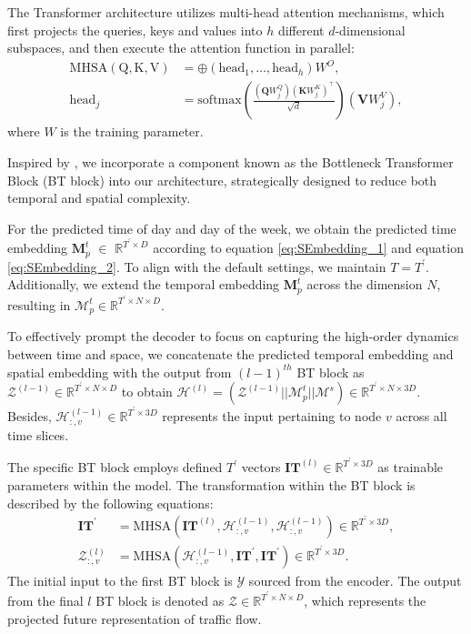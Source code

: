 The Transformer architecture utilizes multi-head attention mechanisms, which first projects the queries, keys and values into $h$ different $d$-dimensional subspaces, and then execute the attention function in parallel:
\begin{equation}
    \begin{aligned}
        \mathrm{MHSA(Q,K,V)}& =\oplus(\mathrm{head}_1,\ldots,\mathrm{head}_h)W^O, \\
        \mathrm{head}_{j}& =\mathrm{softmax}(\frac{(\mathbf{Q}W_{j}^{Q})(\mathbf{K}W_{j}^{K})^{\top}}{\sqrt{d}})(\mathbf{V}W_{j}^{V}), 
    \end{aligned}
\end{equation}
where $W$ is the training parameter.

Inspired by \citet{guo2023SSTBAN}, we incorporate a component known as the Bottleneck Transformer Block (BT block) into our architecture, strategically designed to reduce both temporal and spatial complexity.

For the predicted time of day and day of the week, we obtain the predicted time embedding $\mathbf{M}^{t}_{p}$ $\in$ $\mathbb{R}^{T^\prime \times D}$ according to equation \ref{eq:SEmbedding_1} and equation \ref{eq:SEmbedding_2}. To align with the default settings, we maintain $T = T^\prime$. Additionally, we extend the temporal embedding $\mathbf{M}^{t}_{p}$ across the dimension $ N $, resulting in $\bm{\mathcal{M}}^{t}_{p} \in \mathbb{R}^{T^\prime\times N\times D}$. 

To effectively prompt the decoder to focus on capturing the high-order dynamics between time and space, we concatenate the predicted temporal embedding and spatial embedding with the output from $(l - 1)^{th}$ BT block as $\bm{\mathcal{Z}}^{(l-1)} \in \mathbb{R}^{T^\prime\times N\times D}$ to obtain $\bm{\mathcal{H}}^{(l)}=(\bm{\mathcal{Z}}^{(l-1)}||\bm{\mathcal{M}}^{t}_{p}||\bm{\mathcal{M}}^{s}) \in \mathbb{R}^{T^\prime \times N \times 3D}$. Besides, $\bm{\mathcal{H}}^{(l-1)}_{:,v} \in \mathbb{R}^{T^\prime\times 3D}$ represents the input pertaining to node $v$ across all time slices.

The specific BT block employs defined $T^\prime$ vectors $\mathbf{IT}^{(l)} \in \mathbb{R}^{T^\prime\times 3D}$ as trainable parameters within the model. The transformation within the BT block is described by the following equations:
\begin{equation}
    \begin{aligned}
        \mathbf{IT}^\prime &= \mathrm{MHSA}(\mathbf{IT}^{(l)},\bm{\mathcal{H}}^{(l-1)}_{:,v},\bm{\mathcal{H}}^{(l-1)}_{:,v}) \in \mathbb{R}^{T^\prime\times 3D},\\
       \bm{\mathcal{Z}}^{(l)}_{:,v} &= \mathrm{MHSA}(\bm{\mathcal{H}}^{(l-1)}_{:,v},\mathbf{IT}^\prime,\mathbf{IT}^\prime) \in \mathbb{R}^{T^\prime\times 3D}.
    \end{aligned}
\end{equation}
The initial input to the first BT block is $\bm{\mathcal{Y}}$ sourced from the encoder. The output from the final $l$ BT block is denoted as $\bm{\mathcal{Z}} \in \mathbb{R}^{T^\prime\times N\times D}$, which represents the projected future representation of traffic flow.

